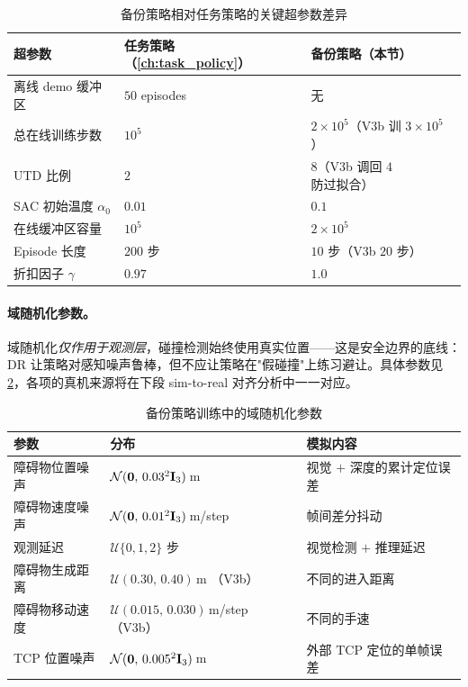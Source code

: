 \begin{table}[htbp]
  \centering
  \caption{备份策略相对任务策略的关键超参数差异}
  \label{tab:backup_hparams}
  \footnotesize
  \begin{tabular}{@{}lll@{}}
    \toprule
    超参数 & 任务策略（\cref{ch:task_policy}） & 备份策略（本节） \\
    \midrule
    离线 demo 缓冲区 & $50$ episodes & 无 \\
    总在线训练步数 & $10^5$ & $2 \times 10^5$（V3b 训 $3 \times 10^5$） \\
    UTD 比例 & $2$ & $8$（V3b 调回 $4$ 防过拟合） \\
    SAC 初始温度 $\alpha_0$ & $0.01$ & $0.1$ \\
    在线缓冲区容量 & $10^5$ & $2 \times 10^5$ \\
    Episode 长度 & $200$ 步 & $10$ 步（V3b $20$ 步） \\
    折扣因子 $\gamma$ & $0.97$ & $1.0$ \\
    \bottomrule
  \end{tabular}
\end{table}

\paragraph{域随机化参数。}域随机化\emph{仅作用于观测层}，碰撞检测始终使用真实位置——这是安全边界的底线：DR 让策略对感知噪声鲁棒，但不应让策略在"假碰撞"上练习避让。具体参数见\cref{tab:backup_dr}，各项的真机来源将在下段 sim-to-real 对齐分析中一一对应。

\begin{table}[htbp]
  \centering
  \caption{备份策略训练中的域随机化参数}
  \label{tab:backup_dr}
  \footnotesize
  \begin{tabular}{@{}lll@{}}
    \toprule
    参数 & 分布 & 模拟内容 \\
    \midrule
    障碍物位置噪声 & $\mathcal{N}(\bm{0},\,0.03^2 \mathbf{I}_3)$\,m & 视觉 $+$ 深度的累计定位误差 \\
    障碍物速度噪声 & $\mathcal{N}(\bm{0},\,0.01^2 \mathbf{I}_3)$\,m/step & 帧间差分抖动 \\
    观测延迟 & $\mathcal{U}\{0, 1, 2\}$ 步 & 视觉检测 $+$ 推理延迟 \\
    障碍物生成距离 & $\mathcal{U}(0.30,\, 0.40)$\,m （V3b）& 不同的进入距离 \\
    障碍物移动速度 & $\mathcal{U}(0.015,\, 0.030)$\,m/step （V3b）& 不同的手速 \\
    TCP 位置噪声 & $\mathcal{N}(\bm{0},\,0.005^2 \mathbf{I}_3)$\,m & 外部 TCP 定位的单帧误差 \\
    \bottomrule
  \end{tabular}
\end{table}

